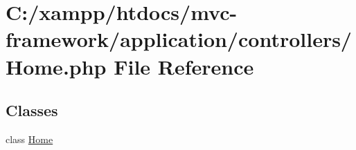 \hypertarget{_home_8php}{}\section{C\+:/xampp/htdocs/mvc-\/framework/application/controllers/\+Home.php File Reference}
\label{_home_8php}
\subsection*{Classes}
\begin{DoxyCompactItemize}
\item 
class \hyperlink{class_home}{Home}
\end{DoxyCompactItemize}
